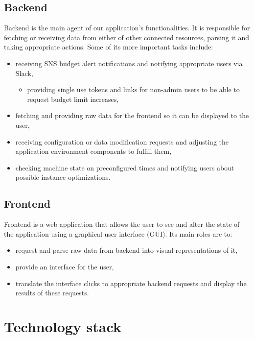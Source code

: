 \documentclass[licencjacka,en]{thesisclass}
\begin{document}
    \subsection{Backend}

    Backend is the main agent of our application's functionalities.
    It is responsible for fetching or receiving data from either of other connected resources, parsing it and taking appropriate actions.
    Some of its more important tasks include:
    \begin{itemize}
        \item receiving SNS budget alert notifications and notifying appropriate users via Slack,
        \begin{itemize}
            \item providing single use tokens and links for non-admin users to be able to request budget limit increases,
        \end{itemize}
        \item fetching and providing raw data for the frontend so it can be displayed to the user,
        \item receiving configuration or data modification requests and adjusting the application environment components to fulfill them,
        \item checking machine state on preconfigured times and notifying users about possible instance optimizations.
    \end{itemize}

    \subsection{Frontend}
    Frontend is a web application that allows the user to see and alter the state of the application using a graphical user interface (GUI).
    Its main roles are to:
    \begin{itemize}
        \item request and parse raw data from backend into visual representations of it,
        \item provide an interface for the user,
        \item translate the interface clicks to appropriate backend requests and display the results of these requests.
    \end{itemize}

    \section{Technology stack}
\end{document}
